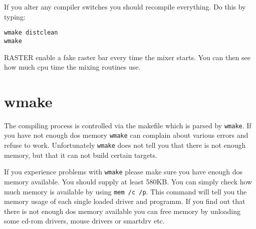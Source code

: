 If you alter any compiler switches you should recompile everything. Do
this by typing:
\begin{verbatim}
wmake distclean
wmake
\end{verbatim}

\begin{dojlist}
\item[RASTER] enable a fake raster bar every time the mixer starts. You can
then see how much cpu time the mixing routines use.
\end{dojlist}

\section{wmake}
The compiling process is controlled via the makefile which is parsed
by \texttt{wmake}. If you have not enough dos memory \texttt{wmake}
can complain about various errors and refuse to work. Unfortunately
\texttt{wmake} does not tell you that there is not enough memory, but
that it can not build certain targets.

If you experience problems with \texttt{wmake} please make sure you
have enough dos memory available. You should supply at least
580KB. You can simply check how much memory is available by using
\texttt{mem /c /p}. This command will tell you the memory usage of
each single loaded driver and programm. If you find out that there is
not enough dos memory available you can free memory by unloading some
cd-rom drivers, mouse drivers or smartdrv etc.
